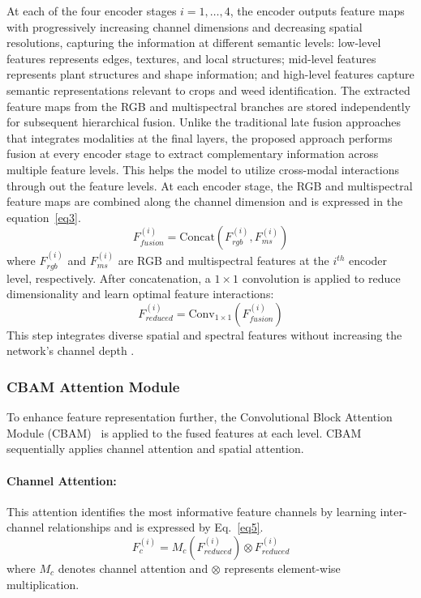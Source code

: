 \documentclass[pdflatex,sn-mathphys-num]{sn-jnl}
\begin{document}
At each of the four encoder stages $i=1,\dots,4$, the encoder outputs feature maps with progressively increasing channel dimensions and decreasing spatial resolutions, capturing the information at different semantic levels: low-level features represents edges, textures, and local structures; mid-level features represents plant structures and shape information; and high-level features capture semantic representations relevant to crops and weed identification. The extracted feature maps from the RGB and multispectral branches are stored independently for subsequent hierarchical fusion. Unlike the traditional late fusion approaches that integrates modalities at the final layers, the proposed approach performs fusion at every encoder stage to extract complementary information across multiple feature levels. This helps the model to utilize cross-modal interactions through out the feature levels. At each encoder stage, the RGB and multispectral feature maps are combined along the channel dimension and is expressed in the equation~\ref{eq3}. 
\begin{equation}
F_{fusion}^{(i)} = \text{Concat}(F_{rgb}^{(i)}, F_{ms}^{(i)})\label{eq3}
\end{equation}
where $F_{rgb}^{(i)}$ and $F_{ms}^{(i)}$ are RGB and multispectral features at the $i^{th}$ encoder level, respectively. After concatenation, a $1\times1$ convolution is applied to reduce dimensionality and learn optimal feature interactions:
\begin{equation}
F_{reduced}^{(i)} = \text{Conv}_{1\times1}(F_{fusion}^{(i)})
\end{equation}
This step integrates diverse spatial and spectral features without increasing the network's channel depth \cite{lin2017fpn}.


\subsubsection{CBAM Attention Module}

To enhance feature representation further, the Convolutional
Block Attention Module (CBAM)~\cite{woo2018cbam} is applied
to the fused features at each level. CBAM sequentially applies
channel attention and spatial attention.

\paragraph{Channel Attention:}
This attention identifies the most informative feature
channels by learning inter-channel relationships and is
expressed by Eq.~\ref{eq5}.
\begin{equation}
F_{c}^{(i)} = M_c(F_{reduced}^{(i)}) \otimes
F_{reduced}^{(i)}
\label{eq5}
\end{equation}
where $M_c$ denotes channel attention and $\otimes$
represents element-wise multiplication.
\end{document}
